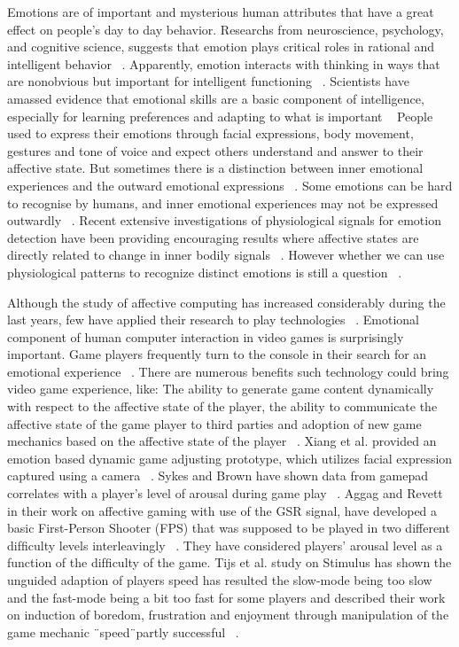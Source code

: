 Emotions are of important and mysterious human attributes that have a great effect on people's day to day behavior. Researchs from neuroscience, psychology, and cognitive science, suggests that emotion plays critical roles in rational and intelligent behavior ~\cite{picard2001toward}. Apparently, emotion interacts with thinking in ways that are nonobvious but important for intelligent functioning ~\cite{picard2001toward}. Scientists have amassed evidence that emotional skills are a basic component of intelligence, especially for learning preferences and adapting to what is important ~\cite{mayer1993intelligence, goleman2006emotional} People used to express their emotions through facial expressions, body movement, gestures and tone of voice and expect others understand and answer to their affective state. But sometimes there is a distinction between inner emotional experiences and the outward emotional expressions ~\cite{picard2003affective}. Some emotions can be hard to recognise by humans, and inner emotional experiences may not be expressed outwardly ~\cite{jones2007biometric}. Recent extensive investigations of physiological signals for emotion detection have been providing encouraging results where affective states are directly related to change in inner bodily signals ~\cite{jones2007biometric}. However whether we can use physiological patterns to recognize distinct emotions is still a question ~\cite{picard2001toward, cacioppo1990inferring}.

Although the study of affective computing has increased considerably during the last years, few have applied their research to play technologies ~\cite{sykes2003affective}. Emotional component of human computer interaction in video games is surprisingly important. Game players frequently turn to the console in their search for an emotional experience ~\cite{rouse2010game}. There are numerous benefits such technology could bring video game experience, like: The ability to generate game content dynamically with respect to the affective state of the player, the ability to communicate the affective state of the game player to third parties and adoption of new game mechanics based on the affective state of the player ~\cite{sykes2003affective}. Xiang et al. provided an emotion based dynamic game adjusting prototype, which utilizes facial expression captured using a camera ~\cite{xiang2013dynamic}. Sykes and Brown have shown data from gamepad correlates with a player’s level of arousal during game play ~\cite{sykes2003affective}. Aggag and Revett in their work on affective gaming with use of the GSR signal, have developed a basic First-Person Shooter (FPS) that was supposed to be played in two different difﬁculty levels interleavingly ~\cite{aggag2011affective}. They have considered players’ arousal level as a function of the difﬁculty of the game. Tijs et al. study on Stimulus has shown the unguided adaption of players speed has resulted the slow-mode being too slow and the fast-mode being a bit too fast for some players and described their work on induction of boredom, frustration and enjoyment through manipulation of the game mechanic ¨speed¨partly successful ~\cite{tijs2009creating}.

